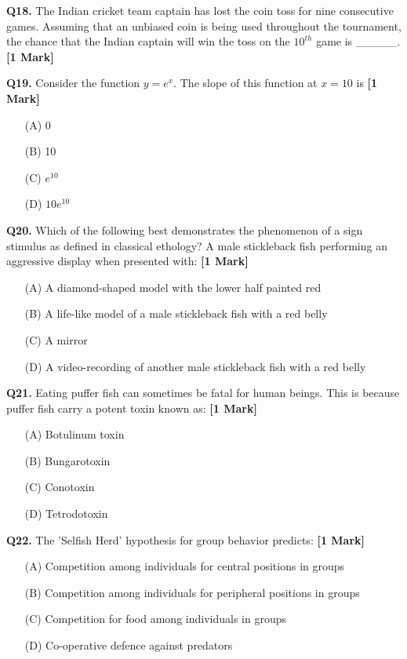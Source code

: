 \documentclass[11pt]{article}
\newcommand{\questiona}[2]{
    \noindent\textbf{Q#2.} #1 \hfill \textbf{[1 Mark]}
}
\begin{document}
\questiona{The Indian cricket team captain has lost the coin toss for nine consecutive games. Assuming that an unbiased coin is being used throughout the tournament, the chance that the Indian captain will win the toss on the $10^{th}$ game is \_\_\_\_\_.}{18}
\vspace{0.5cm}

\questiona{Consider the function $y = e^x$. The slope of this function at $x = 10$ is}{19}
\begin{enumerate}
    \item[(A)] 0  
    \item[(B)] 10  
    \item[(C)] $e^{10}$  
    \item[(D)] $10 e^{10}$  
\end{enumerate}
\vspace{0.5cm}

\questiona{Which of the following best demonstrates the phenomenon of a sign stimulus as defined in classical ethology? A male stickleback fish performing an aggressive display when presented with:}{20}
\begin{enumerate}
    \item[(A)] A diamond-shaped model with the lower half painted red  
    \item[(B)] A life-like model of a male stickleback fish with a red belly  
    \item[(C)] A mirror  
    \item[(D)] A video-recording of another male stickleback fish with a red belly  
\end{enumerate}
\vspace{0.5cm}

\questiona{Eating puffer fish can sometimes be fatal for human beings. This is because puffer fish carry a potent toxin known as:}{21}
\begin{enumerate}
    \item[(A)] Botulinum toxin  
    \item[(B)] Bungarotoxin  
    \item[(C)] Conotoxin  
    \item[(D)] Tetrodotoxin  
\end{enumerate}
\vspace{0.5cm}

\questiona{The 'Selfish Herd' hypothesis for group behavior predicts:}{22}
\begin{enumerate}
    \item[(A)] Competition among individuals for central positions in groups  
    \item[(B)] Competition among individuals for peripheral positions in groups  
    \item[(C)] Competition for food among individuals in groups  
    \item[(D)] Co-operative defence against predators  
\end{enumerate}
\vspace{0.5cm}
\end{document}
